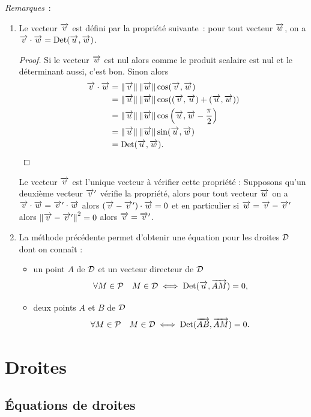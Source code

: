 \emph{Remarques}~:
\begin{enumerate}
\item Le vecteur $\vv$ est défini par la propriété suivante~: pour tout vecteur $\vw$, on a $\vv \cdot \vw=\Det(\vu,\vw)$.
  \begin{proof}
    Si le vecteur $\vw$ est nul alors comme le produit scalaire est nul et le déterminant aussi, c'est bon. Sinon alors 
    \begin{align}
      \vv\cdot\vw&=\norme{\vv}\norme{\vw}\cos(\vv,\vw)\\ 
      &=\norme{\vu}\norme{\vw} \cos((\vv,\vu) + (\vu,\vw))\\ 
      &=\norme{\vu}\norme{\vw} \cos\left(\vu,\vw -\frac{\pi}{2} \right)\\ 
      &=\norme{\vu} \norme{\vw} \sin(\vu,\vw) \\ 
      &=\Det(\vu,\vw).
    \end{align}
  \end{proof}
  Le vecteur $\vv$ est l'unique vecteur à vérifier cette propriété : Supposons qu'un deuxième vecteur $\vv'$ vérifie la propriété, alors pour tout vecteur $\vw$ on a $\vv \cdot \vw =\vv' \cdot \vw$ alors $(\vv-\vv') \cdot \vw=0$ et en particulier si $\vw=\vv-\vv'$ alors $\norme{\vv-\vv'}^2=0$ alors $\vv=\vv'$.
\item La méthode précédente permet d'obtenir une équation pour les droites $\Dr$ dont on connaît :
  \begin{itemize}
  \item un point $A$ de $\Dr$ et un vecteur directeur de $\Dr$
    \begin{equation}
      \forall M \in \P \quad M \in \Dr \iff \Det(\vu, \vect{AM})=0,
    \end{equation}
  \item deux points $A$ et $B$ de $\Dr$ 
    \begin{equation}
      \forall M \in \P \quad M \in \Dr \iff \Det(\vect{AB}, \vect{AM})=0.
    \end{equation}
  \end{itemize}
\end{enumerate}

\section{Droites}
\subsection{Équations de droites}

